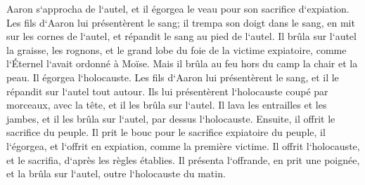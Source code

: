 \verse Aaron s`approcha de l`autel, et il égorgea le veau pour son sacrifice d`expiation. 
\verse Les fils d`Aaron lui présentèrent le sang; il trempa son doigt dans le sang, en mit sur les cornes de l`autel, et répandit le sang au pied de l`autel. 
\verse Il brûla sur l`autel la graisse, les rognons, et le grand lobe du foie de la victime expiatoire, comme l`Éternel l`avait ordonné à Moïse. 
\verse Mais il brûla au feu hors du camp la chair et la peau. 
\verse Il égorgea l`holocauste. Les fils d`Aaron lui présentèrent le sang, et il le répandit sur l`autel tout autour. 
\verse Ils lui présentèrent l`holocauste coupé par morceaux, avec la tête, et il les brûla sur l`autel. 
\verse Il lava les entrailles et les jambes, et il les brûla sur l`autel, par dessus l`holocauste. 
\verse Ensuite, il offrit le sacrifice du peuple. Il prit le bouc pour le sacrifice expiatoire du peuple, il l`égorgea, et l`offrit en expiation, comme la première victime. 
\verse Il offrit l`holocauste, et le sacrifia, d`après les règles établies. 
\verse Il présenta l`offrande, en prit une poignée, et la brûla sur l`autel, outre l`holocauste du matin. 
